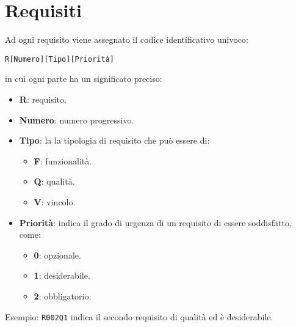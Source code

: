 \section{Requisiti}
Ad ogni requisito viene assegnato il codice identificativo univoco:
	\begin{center}
		\texttt{R[Numero][Tipo][Priorità]} 
	\end{center} 
	in cui ogni parte ha un significato preciso:
	\begin{itemize}
		\item \textbf{R}: requisito.
		\item \textbf{Numero}: numero progressivo.
		\item \textbf{Tipo}: la la tipologia di requisito che può essere di:
		\begin{itemize}
			\item \textbf{F}: funzionalità.
			\item \textbf{Q}: qualità.
			\item \textbf{V}: vincolo.
		\end{itemize}
		\item \textbf{Priorità}: indica il grado di urgenza di un requisito di essere soddisfatto, come:
		\begin{itemize}
			\item \textbf{0}: opzionale.
			\item \textbf{1}: desiderabile.
			\item \textbf{2}: obbligatorio.
		\end{itemize}
	\end{itemize}
	
	Esempio: \texttt{R002Q1} indica il secondo requisito di qualità ed è desiderabile.
	
	

\newcommand{\decrZ}{\addtocounter{vaZ}{+1}} %
\newcommand{\addNumber}[0]{\thevaZ \decrZ} %

\addtocounter{vaZ}{0}

